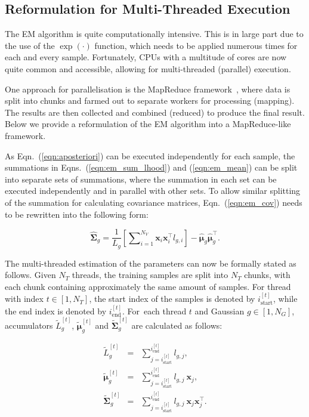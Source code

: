 \documentclass[10pt,a4paper]{article}
\def\Vec#1{{\boldsymbol{#1}}}
\def\Mat#1{{\boldsymbol{#1}}}
\begin{document}
\subsection{Reformulation for Multi-Threaded Execution}
\label{sec:param_em_parallel}

The EM algorithm is quite computationally intensive.
This is in large part due to the use of the {$\exp(\cdot)$} function, which needs to be applied numerous times for each and every sample.
Fortunately, CPUs with a multitude of cores are now quite common and accessible, allowing for multi-threaded (parallel) execution.

One approach for parallelisation is the MapReduce framework~\cite{MapReduce_2004},
where data is split into chunks and farmed out to separate workers for processing (mapping).
The results are then collected and combined (reduced) to produce the final result.
Below we provide a reformulation of the EM algorithm into a MapReduce-like framework.

As Eqn.~(\ref{eqn:aposteriori}) can be executed independently for each sample,
the summations in Eqns.~(\ref{eqn:em_sum_lhood}) and (\ref{eqn:em_mean}) can be split into separate sets of summations,
where the summation in each set can be executed independently and in parallel with other sets.
To allow similar splitting of the summation for calculating covariance matrices,
Eqn.~(\ref{eqn:em_cov}) needs to be rewritten into the following form:

\vspace{-3ex}
\begin{equation}
  \widehat{\Mat{\Sigma}}_g = \frac{1}{L_g} \left[ \sum\nolimits_{i=1}^{N_V} \Vec{x}_i \Vec{x}_i^\top l_{g,i} \right] - \widehat{\Vec{\mu}}_g \widehat{\Vec{\mu}}_g^\top.
\end{equation}

\vspace{-1ex}
The multi-threaded estimation of the parameters can now be formally stated as follows.
Given $N_T$ threads, the training samples are split into $N_T$ chunks, with each chunk containing approximately the same amount of samples.
For thread with index $t \in [1,N_T]$, the start index of the samples is denoted by $i^{[t]}_{\textrm{start}}$,
while the end index is denoted by $i^{[t]}_{\textrm{end}}$.
For~each thread $t$ and Gaussian $g \in [1,N_G]$, accumulators $\widetilde{L}_g^{[t]}$, $\widetilde{\Vec{\mu}}_g^{[t]}$ and $\widetilde{\Mat{\Sigma}}_g^{[t]}$
are calculated as follows:

\vspace{-5ex}
\begin{eqnarray}
  \widetilde{L}_g^{[t]}            & = & \sum\nolimits_{j = i^{[t]}_{\textrm{start}}}^{i^{[t]}_{\textrm{end}}} l_{g,j},                             \\ %
  \widetilde{\Vec{\mu}}_g^{[t]}    & = & \sum\nolimits_{j = i^{[t]}_{\textrm{start}}}^{i^{[t]}_{\textrm{end}}} l_{g,j} ~ \Vec{x}_j,                 \\ %
  \widetilde{\Mat{\Sigma}}_g^{[t]} & = & \sum\nolimits_{j = i^{[t]}_{\textrm{start}}}^{i^{[t]}_{\textrm{end}}} l_{g,j} ~ \Vec{x}_j \Vec{x}_j^\top.     %
\end{eqnarray}%
\end{document}
